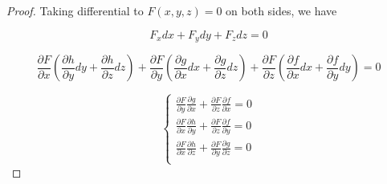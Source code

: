 \documentclass{article}
\begin{document}
    \begin{proof}
        Taking differential to $F(x, y, z) = 0$ on both sides, we have

        $$F_x dx + F_y dy + F_z dz = 0$$

        $$\frac{\partial F}{\partial x}(\frac{\partial h}{\partial y} dy + \frac{\partial h}{\partial z} dz) + \frac{\partial F}{\partial y}(\frac{\partial g}{\partial x} dx + \frac{\partial g}{\partial z} dz) + \frac{\partial F}{\partial z}(\frac{\partial f}{\partial x} dx + \frac{\partial f}{\partial y} dy) = 0$$

        $$\left\{ \begin{array}{ll} 
            \frac{\partial F}{\partial y}\frac{\partial g}{\partial x} + \frac{\partial F}{\partial z}\frac{\partial f}{\partial x} = 0 \\
            \frac{\partial F}{\partial x}\frac{\partial h}{\partial y} + \frac{\partial F}{\partial z}\frac{\partial f}{\partial y} = 0 \\
            \frac{\partial F}{\partial x}\frac{\partial h}{\partial z} + \frac{\partial F}{\partial y}\frac{\partial g}{\partial z} = 0 \\
        \end{array}\right.$$


    \end{proof}
\end{document}
